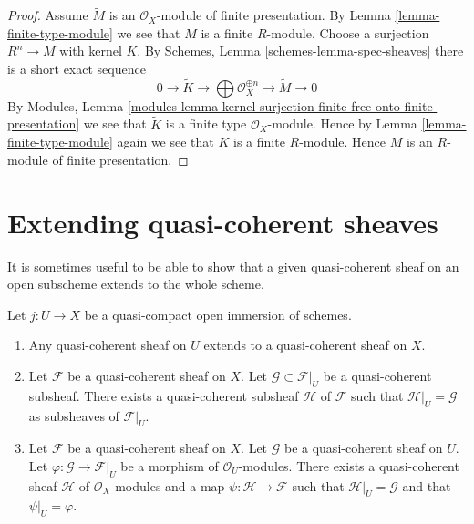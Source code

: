 \begin{proof}
Assume $\widetilde M$ is an $\mathcal{O}_X$-module of finite presentation.
By Lemma \ref{lemma-finite-type-module} we see that $M$ is a finite $R$-module.
Choose a surjection $R^n \to M$ with kernel $K$. By
Schemes, Lemma \ref{schemes-lemma-spec-sheaves}
there is a short exact sequence
$$
0 \to \widetilde{K} \to
\bigoplus \mathcal{O}_X^{\oplus n} \to
\widetilde{M} \to 0
$$
By
Modules, Lemma
\ref{modules-lemma-kernel-surjection-finite-free-onto-finite-presentation}
we see that $\widetilde{K}$ is a finite type $\mathcal{O}_X$-module.
Hence by Lemma \ref{lemma-finite-type-module}
again we see that $K$ is a finite $R$-module.
Hence $M$ is an $R$-module of finite presentation.
\end{proof}













\section{Extending quasi-coherent sheaves}
\label{section-extending-quasi-coherent-sheaves}

\noindent
It is sometimes useful to be able to show that a given quasi-coherent
sheaf on an open subscheme extends to the whole scheme.

\begin{lemma}
\label{lemma-extend-trivial}
Let $j : U \to X$ be a quasi-compact open immersion of schemes.
\begin{enumerate}
\item Any quasi-coherent sheaf on $U$ extends to a quasi-coherent
sheaf on $X$.
\item Let $\mathcal{F}$ be a quasi-coherent sheaf on $X$.
Let $\mathcal{G} \subset \mathcal{F}|_U$ be a quasi-coherent
subsheaf. There exists a quasi-coherent subsheaf $\mathcal{H}$ of
$\mathcal{F}$ such that $\mathcal{H}|_U = \mathcal{G}$
as subsheaves of $\mathcal{F}|_U$.
\item Let $\mathcal{F}$ be a quasi-coherent sheaf on $X$.
Let $\mathcal{G}$ be a quasi-coherent sheaf on $U$.
Let $\varphi : \mathcal{G} \to \mathcal{F}|_U$ be a morphism
of $\mathcal{O}_U$-modules. There exists a quasi-coherent sheaf $\mathcal{H}$
of $\mathcal{O}_X$-modules and a map $\psi : \mathcal{H} \to \mathcal{F}$
such that $\mathcal{H}|_U = \mathcal{G}$ and that
$\psi|_U = \varphi$.
\end{enumerate}
\end{lemma}

